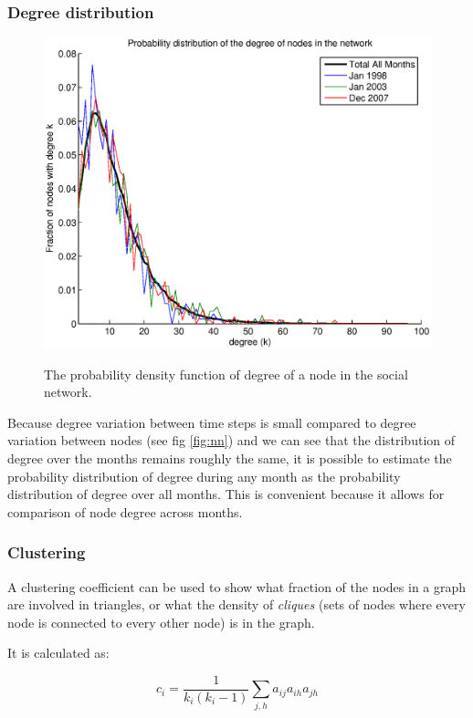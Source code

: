 \documentclass[12pt]{article}
\begin{document}
\subsubsection*{Degree distribution}

\begin{figure}[H]
\includegraphics[trim = 0cm 0cm 0cm 0cm, width = .9\textwidth]{Graficos/ProbDistk.eps}
\label{fig:ProbDistk}
\caption{The probability density function of degree of a node in the social network.}
\label{fig:Pk}
\end{figure}

Because degree variation between time steps is small compared to degree variation between nodes (see fig \ref{fig:nn}) and we can see that the distribution of degree over the months remains roughly the same, it is possible to estimate the probability distribution of degree during any month as the probability distribution of degree over all months. This is convenient because it allows for comparison of node degree across months.

\subsubsection*{Clustering}

A clustering coefficient can be used to show what fraction of the nodes in a graph are involved in triangles, or what the density of \emph{cliques} (sets of nodes where every node is connected to every other node) is in the graph.

It is calculated as:

\begin{equation}
c_i = \frac{1}{k_i(k_i-1)}\sum_{j,h} a_{ij}a_{ih}a_{jh}
\end{equation}
\end{document}
